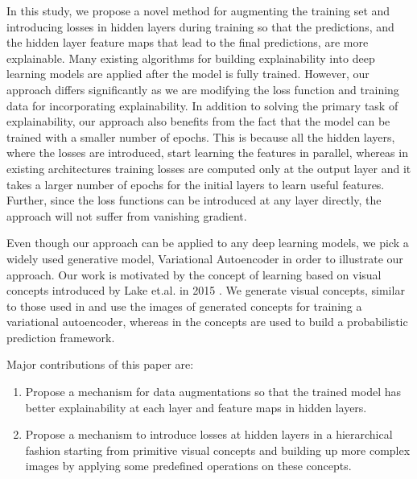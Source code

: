 \documentclass{}
\begin{document}
In this study, we propose a novel method for  augmenting the training set and introducing losses in hidden layers during training so that the predictions, and the hidden layer feature maps that lead to the final predictions,  are more explainable.
Many existing algorithms \cite{ribeiro2016should} \cite{lundberg2017unified} \cite{zhou2016learning} for building explainability into deep learning models are applied after the model is fully trained.
However, our approach differs significantly as we are modifying the loss function and training data for incorporating explainability.
In addition to solving  the primary task of explainability, our approach also benefits from the fact that  the model can be trained with a smaller number of epochs.
This is because all the hidden layers, where the losses are introduced,  start learning the features in parallel, whereas in existing architectures training losses are computed only at the output layer and it takes a larger number of epochs for the initial layers to learn useful features.
Further, since the loss functions can be introduced at any layer directly, the approach will not suffer from vanishing gradient.

Even though our approach can be applied to any deep learning models, we pick a widely used generative model, Variational Autoencoder \cite{kingma2013auto} in order to illustrate our approach.
Our work is motivated by the concept of learning based on visual concepts  introduced by Lake et.al. in 2015 \cite{lake2015human}.
We generate visual concepts, similar to those used in \cite{lake2015human} and use the images of generated concepts for training a variational autoencoder, whereas in \cite{lake2015human} the concepts are used to build a probabilistic prediction framework.


Major contributions of this paper are:
\begin{enumerate}
  \item Propose a mechanism for data augmentations so that the trained model has better explainability at each layer and feature maps in hidden layers.
  \item Propose a mechanism to introduce losses at hidden layers in a hierarchical fashion starting from primitive visual concepts and building up more complex images by applying some predefined operations on these concepts.
\end{enumerate}


\end{document}

